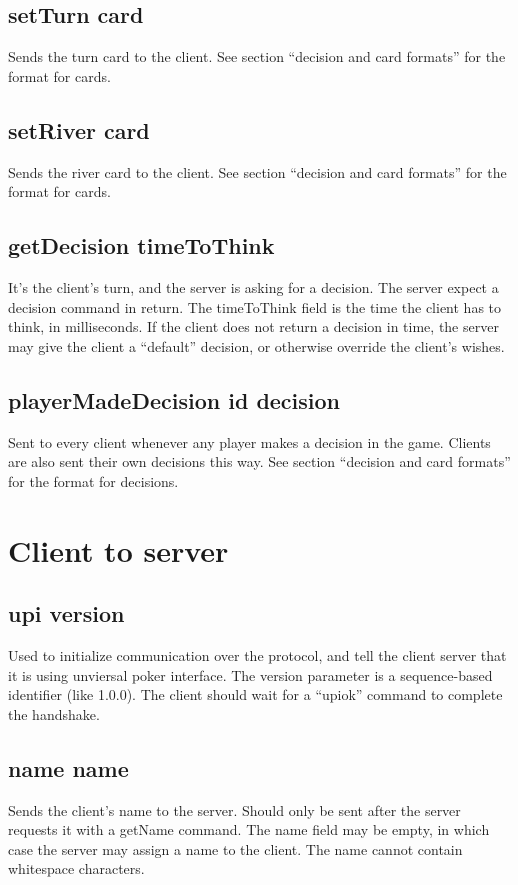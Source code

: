 \documentclass{article}
\begin{document}
\subsection*{setTurn \textlangle{}card\textrangle{}}
Sends the turn card to the client. See section ``decision and card formats'' for the format for cards.

\subsection*{setRiver \textlangle{}card\textrangle{}}
Sends the river card to the client. See section ``decision and card formats'' for the format for cards.

\subsection*{getDecision \textlangle{}timeToThink\textrangle{}}
It's the client's turn, and the server is asking for a decision. The server expect a decision command in return. The timeToThink field is the time the client has to think, in milliseconds. If the client does not return a decision in time, the server may give the client a ``default'' decision, or otherwise override the client's wishes.

\subsection*{playerMadeDecision \textlangle{}id\textrangle{} \textlangle{}decision\textrangle{}}
Sent to every client whenever any player makes a decision in the game. Clients are also sent their own decisions this way. See section ``decision and card formats'' for the format for decisions.

\section{Client to server}

\subsection*{upi \textlangle{}version\textrangle{}}
Used to initialize communication over the protocol, and tell the client server that it is using unviersal poker interface. The version parameter is a sequence-based identifier (like 1.0.0). The client should wait for a ``upiok'' command to complete the handshake.

\subsection*{name \textlangle{}name\textrangle{}}
Sends the client's name to the server. Should only be sent after the server requests it with a getName command. The name field may be empty, in which case the server may assign a name to the client. The name cannot contain whitespace characters.
\end{document}
